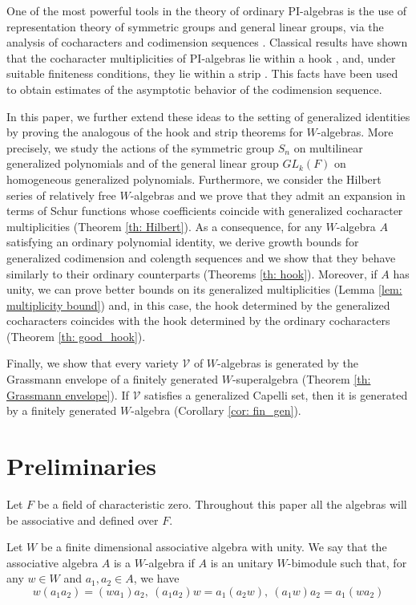 \documentclass{article}
\newcommand{\cV}{\mathcal{V}}
\begin{document}
One of the most powerful tools in the theory of ordinary PI-algebras is the use of representation theory of symmetric groups and general linear groups, via the analysis of cocharacters and codimension sequences \cite{Ber82}. Classical results have shown that the cocharacter multiplicities of PI-algebras lie within a hook \cite{AR82}, and, under suitable finiteness conditions, they lie within a strip \cite{Reg79}. This facts have been used to obtain estimates of the asymptotic behavior of the codimension sequence.

In this paper, we further extend these ideas to the setting of generalized identities by proving the analogous of the hook and strip theorems for $W$-algebras. More precisely, we study the actions of the symmetric group $S_n$ on multilinear generalized polynomials and of the general linear group $GL_k(F)$ on homogeneous generalized polynomials. Furthermore, we consider the Hilbert series of relatively free $W$-algebras and we prove that they admit an expansion in terms of Schur functions whose coefficients coincide with generalized cocharacter multiplicities (Theorem \ref{th: Hilbert}). As a consequence, for any $W$-algebra $A$ satisfying an ordinary polynomial identity, we derive growth bounds for generalized codimension and colength sequences and we show that they behave similarly to their ordinary counterparts (Theorems \ref{th: hook}).
Moreover, if $A$ has unity, we can prove better bounds on its generalized multiplicities (Lemma \ref{lem: multiplicity bound}) and, in this case, the hook determined by the generalized cocharacters coincides with the hook determined by the ordinary cocharacters (Theorem \ref{th: good_hook}).

Finally, we show that every variety $\cV$ of $W$-algebras is generated by the Grassmann envelope of a finitely generated $W$-superalgebra (Theorem \ref{th: Grassmann envelope}). If $\cV$ satisfies a generalized Capelli set, then it is generated by a finitely generated $W$-algebra (Corollary \ref{cor: fin_gen}). 

\section{Preliminaries}

Let $F$ be a field of characteristic zero. Throughout this paper all the algebras will be associative and defined over $F$.

Let $W$ be a finite dimensional associative algebra with unity. We say that the associative algebra $A$ is a $W$-algebra if $A$ is an unitary $W$-bimodule such that, for any $w\in W$ and $a_1,a_2\in A$, we have \begin{equation}\label{eq: W axioms}
    w(a_1a_2)=(wa_1)a_2,\ (a_1a_2)w= a_1(a_2w),\ (a_1w)a_2=a_1(wa_2)
\end{equation}
\end{document}
